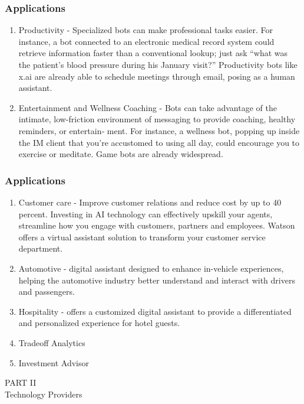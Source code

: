\documentclass[11pt]{beamer}
\begin{document}
\begin{frame}
\frametitle{Applications}
\begin{enumerate}
	\item Productivity - Specialized bots can make professional tasks easier. For instance, a bot connected to an electronic medical record system could retrieve information faster than a conventional lookup; just ask “what was the patient’s blood pressure during his January visit?”
	Productivity bots like x.ai are already able to schedule meetings through email, posing as a human assistant.
	\item Entertainment and Wellness Coaching - Bots can take advantage of the intimate, low-friction environment of messaging to provide coaching, healthy reminders, or entertain‐ ment. For instance, a wellness bot, popping up inside the IM client that you’re accustomed to using all day, could encourage you to exercise or meditate. Game bots are already widespread.
\end{enumerate}
\end{frame}

\begin{frame}
	\frametitle{Applications}
	\begin{enumerate}
		\item Customer care - Improve customer relations and reduce cost by up to 40 percent. Investing in AI technology can effectively upskill your agents, streamline how you engage with customers, partners and employees. Watson offers a virtual assistant solution to transform your customer service department.
		\item Automotive - digital assistant designed to enhance in-vehicle experiences, helping the automotive industry better understand and interact with drivers and passengers.
		\item Hospitality - offers a customized digital assistant to provide a differentiated and personalized experience for hotel guests.
		\item Tradeoff Analytics
		\item Investment Advisor
	\end{enumerate}
\end{frame}

\begin{frame}
\begin{center}
	PART II \\ Technology Providers
\end{center}
\end{frame}
\end{document}

